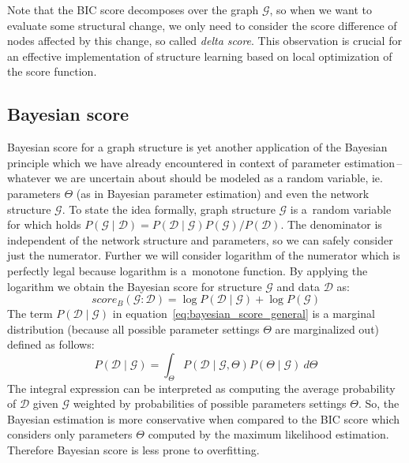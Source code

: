 \documentclass[english,cover]{fitthesis} %
\newcommand{\term}[1]{\emph{#1}}           %
\begin{document}
Note that the BIC score decomposes over the graph $\mathcal{G}$, so when we want to evaluate some structural change, we only need to consider the score difference of nodes affected by this change, so called \term{delta score}. This observation is crucial for an effective implementation of structure learning based on local optimization of the score function. 



\subsection{Bayesian score}
Bayesian score for a graph structure is yet another application of the Bayesian principle which we have already encountered in context of parameter estimation\,--\,whatever we are uncertain about should be modeled as a random variable, ie. parameters $\Theta$ (as in Bayesian parameter estimation) and even the network structure $\mathcal{G}$. To state the idea formally, graph structure $\mathcal{G}$ is a~random variable for which holds $P(\mathcal{G} \mid \mathcal{D}) = P(\mathcal{D} \mid \mathcal{G}) P(\mathcal{G}) / P(\mathcal{D})$. The denominator is independent of the network structure and parameters, so we can safely consider just the numerator. Further we will consider logarithm of the numerator which is perfectly legal because logarithm is a~monotone function. By applying the logarithm we obtain the Bayesian score for structure $\mathcal{G}$ and data $\mathcal{D}$ as:
\begin{equation}\label{eq:bayesian_score_general}
    score_B(\mathcal{G} : \mathcal{D}) = \log P(\mathcal{D} \mid \mathcal{G}) + \log P(\mathcal{G})
\end{equation}
The term $P(\mathcal{D} \mid \mathcal{G})$ in equation~\eqref{eq:bayesian_score_general} is a marginal distribution (because all possible parameter settings $\Theta$ are marginalized out) defined as follows:
\begin{equation}\label{eq:bayesian_score_marginal}
    P(\mathcal{D} \mid \mathcal{G})
    =
    \int_{\Theta} P(\mathcal{D} \mid \mathcal{G}, \Theta) P(\Theta \mid \mathcal{G}) \ d \Theta
\end{equation}
The integral expression can be interpreted as computing the average probability of $\mathcal{D}$ given $\mathcal{G}$ weighted by probabilities of possible parameters settings $\Theta$. So, the Bayesian estimation is more conservative when compared to the BIC score which considers only parameters $\Theta$ computed by the maximum likelihood estimation. Therefore Bayesian score is less prone to overfitting.
\end{document}
